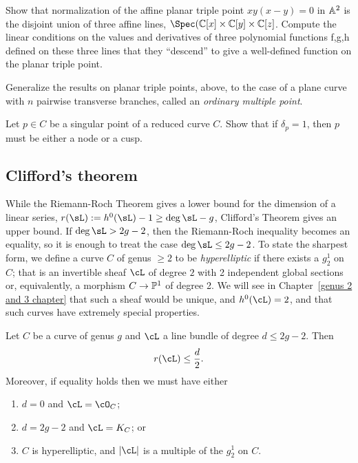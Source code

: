 \begin{exercise}
Show that normalization of the affine planar triple point $xy(x-y) = 0$ in $\AA^2$ is the disjoint union of three
affine lines, $\Spec(\CC[x] \times \CC[y]\times \CC[z]$. Compute the linear conditions on the values and derivatives of three polynomial functions f,g,h defined on
these three lines that they ``descend'' to give a well-defined function on the planar triple point.
\end{exercise}

\begin{exercise} Generalize the results on planar triple points, above, to the case of a plane curve with $n$ pairwise
transverse branches, called an \emph{ordinary multiple point}.
\end{exercise}

\begin{exercise}
Let $p \in C$ be a singular point of a reduced curve $C$. Show that if $\delta_p = 1$, then $p$ must be either a node or a cusp.
\end{exercise}


\subsection{Clifford's theorem}

While the Riemann-Roch Theorem gives a lower bound for the dimension of a linear series, $r(\sL) := h^0(\sL)-1 \geq \deg \sL -g$, Clifford's Theorem
gives an upper bound. If $\deg \sL>2g-2$, then the Riemann-Roch inequality becomes an equality, so it is enough to treat the case $\deg \sL \leq 2g-2$.
To state the sharpest form, we define a curve $C$ of genus $\geq 2$ to be \emph{hyperelliptic} if there exists a $g^1_2$ on $C$; that is an
invertible sheaf $\cL$ of degree $2$ with 2 independent global sections or, equivalently, a morphism $C\to \PP^1$ of degree 2. We will see in Chapter~\ref{genus 2 and 3 chapter} that such a sheaf would be unique, and $h^0(\cL) = 2$, and that such curves have extremely special properties.


\begin{theorem}\label{Clifford}
Let $C$ be a curve of genus $g$ and $\cL$ a line bundle of degree $d \leq 2g-2$. Then
$$
r(\cL) \leq \frac{d}{2}.
$$
Moreover, if  equality holds then we must have either
\begin{enumerate}
\item $d=0$ and $\cL = \cO_C$;
\item $d = 2g-2$ and $\cL = K_C$; or
\item $C$ is hyperelliptic, and $|\cL|$ is a multiple of the $g^1_2$ on $C$.
\end{enumerate}
\end{theorem}

